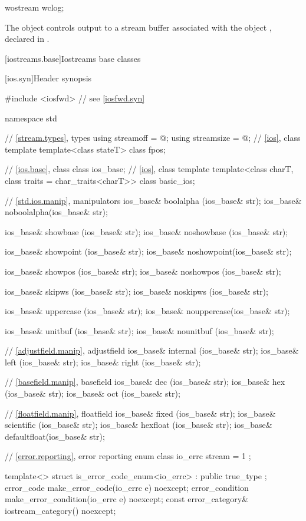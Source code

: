 %
\begin{itemdecl}
wostream wclog;
\end{itemdecl}

\begin{itemdescr}
\pnum
The object 
controls output to a stream buffer associated with the object ,
declared in .
\end{itemdescr}

[iostreams.base]{Iostreams base classes}

[ios.syn]{Header  synopsis}

%
%
\begin{codeblock}
#include <iosfwd>   // see \ref{iosfwd.syn}

namespace std {
  // \ref{stream.types}, types
  using streamoff  = @\impdef@;
  using streamsize = @\impdef@;
  // \ref{ios}, class template 
  template<class stateT> class fpos;

  // \ref{ios.base}, class 
  class ios_base;
  // \ref{ios}, class template 
  template<class charT, class traits = char_traits<charT>>
    class basic_ios;

  // \ref{std.ios.manip}, manipulators
  ios_base& boolalpha  (ios_base& str);
  ios_base& noboolalpha(ios_base& str);

  ios_base& showbase   (ios_base& str);
  ios_base& noshowbase (ios_base& str);

  ios_base& showpoint  (ios_base& str);
  ios_base& noshowpoint(ios_base& str);

  ios_base& showpos    (ios_base& str);
  ios_base& noshowpos  (ios_base& str);

  ios_base& skipws     (ios_base& str);
  ios_base& noskipws   (ios_base& str);

  ios_base& uppercase  (ios_base& str);
  ios_base& nouppercase(ios_base& str);

  ios_base& unitbuf    (ios_base& str);
  ios_base& nounitbuf  (ios_base& str);

  // \ref{adjustfield.manip}, adjustfield
  ios_base& internal   (ios_base& str);
  ios_base& left       (ios_base& str);
  ios_base& right      (ios_base& str);

  // \ref{basefield.manip}, basefield
  ios_base& dec        (ios_base& str);
  ios_base& hex        (ios_base& str);
  ios_base& oct        (ios_base& str);

  // \ref{floatfield.manip}, floatfield
  ios_base& fixed      (ios_base& str);
  ios_base& scientific (ios_base& str);
  ios_base& hexfloat   (ios_base& str);
  ios_base& defaultfloat(ios_base& str);

  // \ref{error.reporting}, error reporting
  enum class io_errc {
    stream = 1
  };

  template<> struct is_error_code_enum<io_errc> : public true_type { };
  error_code make_error_code(io_errc e) noexcept;
  error_condition make_error_condition(io_errc e) noexcept;
  const error_category& iostream_category() noexcept;
}
\end{codeblock}
